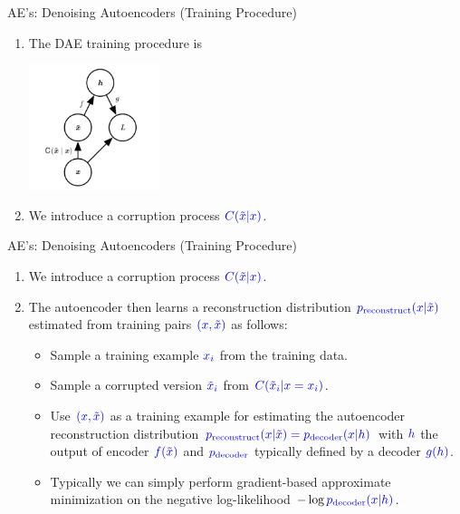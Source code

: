 \documentclass[serif, aspectratio=169]{beamer}
\begin{document}
\begin{frame}{AE’s: Denoising Autoencoders (Training Procedure)}
    \small
    \vspace{-0.3cm}
    \begin{enumerate}
        \item The DAE training procedure is
        \begin{center}
            \includegraphics[width=0.3\textwidth]{pic/DAE training.png} 
        \end{center}
        
        \item We introduce a corruption process \( \textcolor{blue}{C(\tilde{x} | x)} \).
    \end{enumerate}
    \vspace{0.3cm}
\end{frame}

\begin{frame}{AE’s: Denoising Autoencoders (Training Procedure)}
    \small
    \vspace{-0.2cm}
    \begin{enumerate}
        \item We introduce a corruption process \( \textcolor{blue}{C(\tilde{x} | x)} \).
        \item The autoencoder then learns a reconstruction distribution \( \textcolor{blue}{p_{\text{reconstruct}}(x | \tilde{x})} \) estimated from training pairs \( \textcolor{blue}{(x, \tilde{x})} \) as follows:
        \begin{itemize}
            \item Sample a training example \( \textcolor{blue}{x_i} \) from the training data.
            \item Sample a corrupted version \( \textcolor{blue}{\tilde{x}_i} \) from \( \textcolor{blue}{C(\tilde{x}_i | x = x_i)} \).
            \item Use \( \textcolor{blue}{(x, \tilde{x})} \) as a training example for estimating the autoencoder reconstruction distribution \( \textcolor{blue}{p_{\text{reconstruct}}(x|\tilde{x}) = p_{\text{decoder}}(x|h)} \) with \( \textcolor{blue}{h} \) the output of encoder \( \textcolor{blue}{f(\tilde{x})} \) and \( \textcolor{blue}{p_{\text{decoder}}} \) typically defined by a decoder \( \textcolor{blue}{g(h)} \).
            \item Typically we can simply perform gradient-based approximate minimization on the negative log-likelihood \( -\log \textcolor{blue}{p_{\text{decoder}}(x|h)} \).
        \end{itemize}
    \end{enumerate}
    \vspace{0.3cm}
\end{frame}
\end{document}
